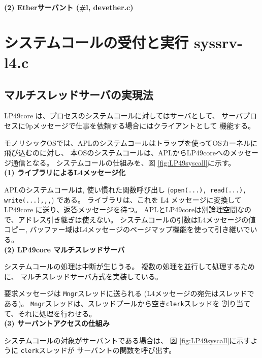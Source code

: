{{\bf\flushleft  (2) Etherサーバント (\#l, devether.c)}

\vspace{4cm}


\chapter{システムコールの受付と実行  syssrv-l4.c}

\section{マルチスレッドサーバの実現法}

  LP49core は、プロセスのシステムコールに対してはサーバとして、
  サーバプロセスに9pメッセージで仕事を依頼する場合にはクライアントとして
  機能する。

  モノリシックOSでは、APLのシステムコールはトラップを使ってOSカーネルに飛び込むのに対し、
本OSのシステムコールは、APLからLP49coreへのメッセージ通信となる。
  システムコールの仕組みを、図 \ref{fig:LP49syscall}に示す。
\\

{\bf\flushleft (1) ライブラリによるL4メッセージ化}

   APLのシステムコールは, 使い慣れた関数呼び出し 
({\tt open(...), read(...), write(...),,,})  である。
  ライブラリは、これを L4 メッセージに変換して LP49core に送り、返答メッセージを待つ。
  APLとLP49coreは別論理空間なので、アドレス引き継ぎは使えない。
  システムコールの引数はL4メッセージの値コピー, 
  バッファー域はL4メッセージのページマップ機能を使って引き継いでいる。
\\

{\bf\flushleft (2) LP49core マルチスレッドサーバ}

    システムコールの処理は中断が生じうる。
    複数の処理を並行して処理するために、
    マルチスレッドサーバ方式を実装している。

    要求メッセージは {\tt Mngr}スレッドに送られる
    (L4メッセージの宛先はスレッドである)。
    {\tt Mngr}スレッドは、スレッドプールから空き{\tt clerk}スレッドを
    割り当てて、それに処理を行わせる。
\\

{\bf\flushleft (3) サーバントアクセスの仕組み}
  
    システムコールの対象がサーバントである場合は、
    図 \ref{fig:LP49syscall}に示すように {\tt clerk}スレッドが
    サーバントの関数を呼び出す。
\\

}
